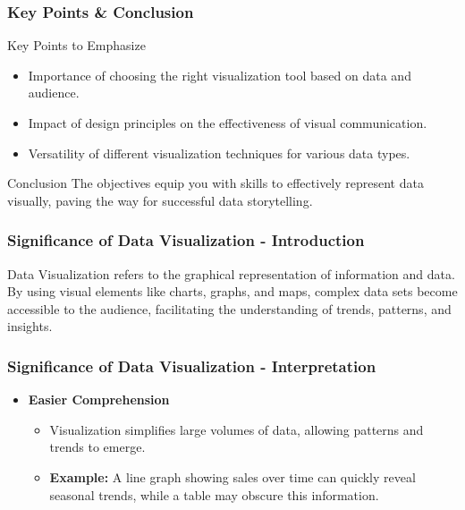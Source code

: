 \documentclass[aspectratio=169]{beamer}
\begin{document}
\begin{frame}
    \frametitle{Key Points & Conclusion}
    \begin{block}{Key Points to Emphasize}
        \begin{itemize}
            \item Importance of choosing the right visualization tool based on data and audience.
            \item Impact of design principles on the effectiveness of visual communication.
            \item Versatility of different visualization techniques for various data types.
        \end{itemize}
    \end{block}
    
    \begin{block}{Conclusion}
        The objectives equip you with skills to effectively represent data visually, paving the way for successful data storytelling.
    \end{block}
\end{frame}

\begin{frame}[fragile]
    \frametitle{Significance of Data Visualization - Introduction}
    Data Visualization refers to the graphical representation of information and data. By using visual elements like charts, graphs, and maps, complex data sets become accessible to the audience, facilitating the understanding of trends, patterns, and insights.
\end{frame}

\begin{frame}[fragile]
    \frametitle{Significance of Data Visualization - Interpretation}
    \begin{itemize}
        \item \textbf{Easier Comprehension}
        \begin{itemize}
            \item Visualization simplifies large volumes of data, allowing patterns and trends to emerge.
            \item \textbf{Example:} A line graph showing sales over time can quickly reveal seasonal trends, while a table may obscure this information.
        \end{itemize}
    \end{itemize}
\end{frame}
\end{document}
